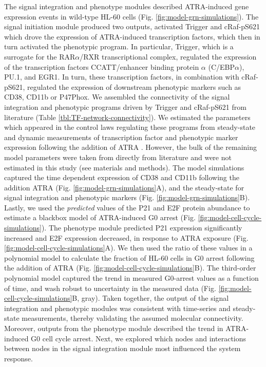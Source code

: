 \documentclass[12pt]{article}
\begin{document}
The signal integration and phenotype modules described ATRA-induced gene expression events in wild-type HL-60 cells (Fig. \ref{fig:model-grn-simulations}).
The signal initiation module produced two outputs, activated Trigger and cRaf-pS621 which drove the expression of ATRA-induced transcription factors,
which then in turn activated the phenotypic program. In particular, Trigger, which is a surrogate for the RAR$\alpha$/RXR transcriptional complex,
regulated the expression of the transcription factors CCATT/enhancer binding protein $\alpha$ (C/EBP$\alpha$), PU.1, and EGR1.
In turn, these transcription factors, in combination with cRaf-pS621, regulated the expression of downstream phenotypic markers such as CD38, CD11b or P47Phox.
We assembled the connectivity of the signal integration and phenotypic programs driven by Trigger and cRaf-pS621 from literature (Table \ref{tbl:TF-network-connectivity}).
We estimated the parameters which appeared in the control laws regulating these programs
from steady-state and dynamic measurements of transcription factor and phenotypic marker expression following the addition of ATRA \cite{Jensen:2013aa,Jensen:2014aa,Jensen:2015ab,Jensen:2015aa}.
However, the bulk of the remaining model parameters were taken from directly from literature \cite{Milo:2010aa} and were not estimated in this study (see materials and methods).
The model simulations captured the time dependent expression of CD38 and CD11b following the addition ATRA (Fig. \ref{fig:model-grn-simulations}A),
and the steady-state for signal integration and phenotypic markers (Fig. \ref{fig:model-grn-simulations}B).
Lastly, we used the \textit{predicted} values of the P21 and E2F protein abundance to estimate a blackbox model of ATRA-induced G0 arrest (Fig. \ref{fig:model-cell-cycle-simulations}).
The phenotype module predicted P21 expression significantly increased and E2F expression decreased, in response to ATRA exposure (Fig. \ref{fig:model-cell-cycle-simulations}A).
We then used the ratio of these values in a polynomial model to calculate the fraction of HL-60 cells in G0 arrest following the addition of ATRA (Fig. \ref{fig:model-cell-cycle-simulations}B).
The third-order polynomial model captured the trend in measured G0-arrest values as a function of time, and wash robust to uncertainty in the measured data (Fig. \ref{fig:model-cell-cycle-simulations}B, gray).
Taken together, the output of the signal integration and phenotypic modules was consistent with time-series and steady-state measurements, thereby validating the assumed molecular connectivity.
Moreover, outputs from the phenotype module described the trend in ATRA-induced G0 cell cycle arrest.
Next, we explored which nodes and interactions between nodes in the signal integration module most influenced the system response.
\end{document}
